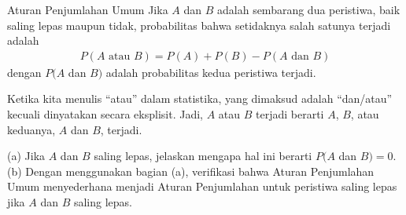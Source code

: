 \begin{onebox}{Aturan Penjumlahan Umum}
  Jika $A$ dan $B$ adalah sembarang dua peristiwa, baik saling lepas maupun tidak,
  probabilitas bahwa setidaknya salah satunya terjadi adalah
  \begin{align*}
  P(A\text{ atau }B) = P(A) + P(B) - P(A\text{ dan }B)
  \end{align*}
  dengan $P(A$ dan $B)$ adalah probabilitas kedua peristiwa terjadi.
\end{onebox}

\begin{tipBox}{
Ketika kita menulis “atau” dalam statistika, yang dimaksud adalah “dan/atau” kecuali dinyatakan secara eksplisit. Jadi, $A$ atau $B$ terjadi berarti $A$, $B$, atau keduanya, $A$ dan $B$, terjadi.}
\end{tipBox}

\begin{exercisewrap}
\begin{nexercise}
(a) Jika $A$ dan $B$ saling lepas, jelaskan mengapa hal ini berarti $P(A$ dan $B) = 0$. (b) Dengan menggunakan bagian (a), verifikasi bahwa Aturan Penjumlahan Umum menyederhana menjadi Aturan Penjumlahan untuk peristiwa saling lepas jika $A$ dan $B$ saling lepas.\footnotemark
\end{nexercise}
\end{exercisewrap}


